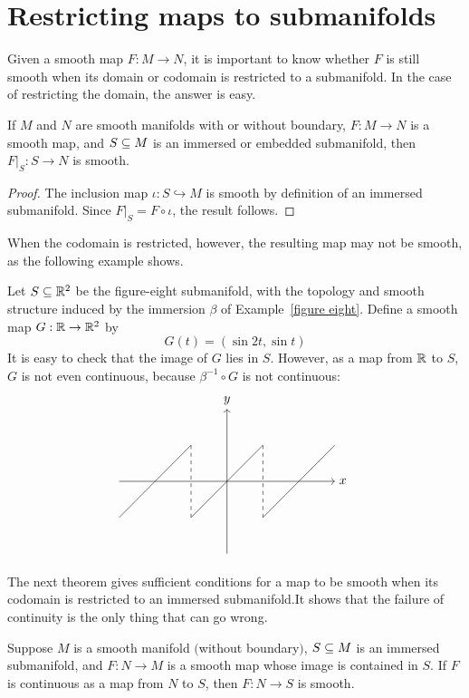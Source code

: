 \section{Restricting maps to submanifolds}
Given a smooth map $F:M\to N$, it is important to know whether $F$ is still smooth
when its domain or codomain is restricted to a submanifold. In the case of restricting the domain, the answer is easy.
\begin{theorem}\label{restrict domain}
If $M$ and $N$ are smooth manifolds with or without boundary, $F:M\to N$ is a smooth map, and $S\subseteq M$ is an immersed or embedded submanifold, then $F|_S:S\to N$ is smooth.
\end{theorem}
\begin{proof}
The inclusion map $\iota:S\hookrightarrow M$ is smooth by definition of an immersed submanifold. Since $F|_S=F\circ\iota$, the result follows.
\end{proof}
When the codomain is restricted, however, the resulting map may not be smooth,
as the following example shows.
\begin{example}
Let $S\subseteq\mathbb{R}^2$ be the figure-eight submanifold, with the topology and smooth structure induced by the immersion $\beta$ of Example~\ref{figure eight}. Define a smooth map $G:\mathbb{R}\to\mathbb{R}^2$ by
\[G(t)=(\sin 2t,\sin t)\]
It is easy to check that the image of $G$ lies in $S$. However, as a map from $\mathbb{R}$ to $S$, $G$ is not even continuous, because $\beta^{-1}\circ G$ is not continuous:
\[\begin{tikzpicture}[domain=0:4]
\draw[->] (-3,0) -- (3,0) node[right] {$x$};
\draw[->] (0,-2) -- (0,2) node[above] {$y$};
\draw (0,0)--(1,1);
\draw (0,0)--(-1,-1);
\draw (1,-1)--(2,0)--(3,1);
\draw (-1,1)--(-2,0)--(-3,-1);
\draw[dashed] (1,1)--(1,-1);
\draw[dashed] (-1,1)--(-1,-1);
\end{tikzpicture}\]
\end{example}
The next theorem gives sufficient conditions for a map to be smooth when its codomain is restricted to an immersed submanifold.It shows that the failure of continuity is the only thing that can go wrong.
\begin{theorem}\label{restrict to codomain}
Suppose $M$ is a smooth manifold $($without boundary$)$, $S\subseteq M$ is an immersed submanifold, and $F:N\to M$ is a smooth map whose image is contained in $S$. If $F$ is continuous as a map from $N$ to $S$, then $F:N\to S$ is smooth.
\end{theorem}
